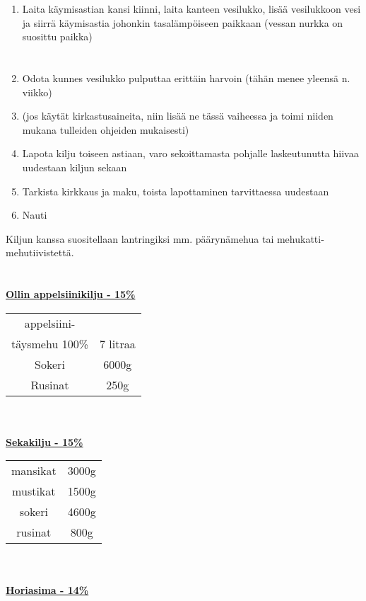 \documentclass[20pt, a4]{article}
\begin{document}
{\begin{enumerate}
     \item Laita käymisastian kansi kiinni, laita kanteen vesilukko, lisää vesilukkoon vesi ja siirrä käymisastia johonkin tasalämpöiseen paikkaan (vessan nurkka on suosittu paikka)
     \section{}
     \item Odota kunnes vesilukko pulputtaa erittäin harvoin (tähän menee yleensä n. viikko)
     \item (jos käytät kirkastusaineita, niin lisää ne tässä vaiheessa ja toimi niiden mukana tulleiden ohjeiden mukaisesti)
     \item Lapota kilju toiseen astiaan, varo sekoittamasta pohjalle laskeutunutta hiivaa uudestaan kiljun sekaan
     \item Tarkista kirkkaus ja maku, toista lapottaminen tarvittaessa uudestaan
     \item Nauti
    \end{enumerate}
    Kiljun kanssa suositellaan lantringiksi mm. päärynämehua tai mehukatti-mehutiivistettä.


    \pagebreak
    \section{}
    \underline{\textbf{Ollin appelsiinikilju - 15\%}}

    \begin{tabular}{ cc } 
        appelsiini-\\
        täysmehu 100\% & 7 litraa\\
        Sokeri & 6000g\\
        Rusinat & 250g\\
    \end{tabular}
    \\
    \\
    \underline{\textbf{Sekakilju - 15\%}}


    \begin{tabular}{ cc } 
        mansikat & 3000g  \\
        mustikat & 1500g \\
        sokeri & 4600g \\
        rusinat & 800g \\
    \end{tabular}
    \\
    \\
    \underline{\textbf{Horiasima - 14\%}}

}
\end{document}
